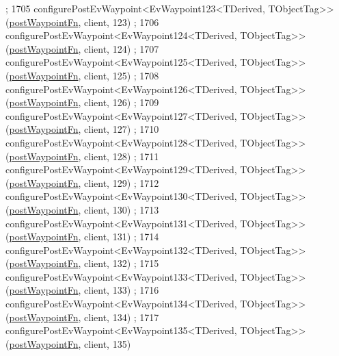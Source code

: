 \begin{DoxyCode}
      ;
1705     configurePostEvWaypoint<EvWaypoint123<TDerived, TObjectTag>>(\hyperlink{classcl__move__base__z_1_1WaypointEventDispatcher_a964a57fcce5d48ec60243230722d8dd7}{postWaypointFn}, client, 123)
      ;
1706     configurePostEvWaypoint<EvWaypoint124<TDerived, TObjectTag>>(\hyperlink{classcl__move__base__z_1_1WaypointEventDispatcher_a964a57fcce5d48ec60243230722d8dd7}{postWaypointFn}, client, 124)
      ;
1707     configurePostEvWaypoint<EvWaypoint125<TDerived, TObjectTag>>(\hyperlink{classcl__move__base__z_1_1WaypointEventDispatcher_a964a57fcce5d48ec60243230722d8dd7}{postWaypointFn}, client, 125)
      ;
1708     configurePostEvWaypoint<EvWaypoint126<TDerived, TObjectTag>>(\hyperlink{classcl__move__base__z_1_1WaypointEventDispatcher_a964a57fcce5d48ec60243230722d8dd7}{postWaypointFn}, client, 126)
      ;
1709     configurePostEvWaypoint<EvWaypoint127<TDerived, TObjectTag>>(\hyperlink{classcl__move__base__z_1_1WaypointEventDispatcher_a964a57fcce5d48ec60243230722d8dd7}{postWaypointFn}, client, 127)
      ;
1710     configurePostEvWaypoint<EvWaypoint128<TDerived, TObjectTag>>(\hyperlink{classcl__move__base__z_1_1WaypointEventDispatcher_a964a57fcce5d48ec60243230722d8dd7}{postWaypointFn}, client, 128)
      ;
1711     configurePostEvWaypoint<EvWaypoint129<TDerived, TObjectTag>>(\hyperlink{classcl__move__base__z_1_1WaypointEventDispatcher_a964a57fcce5d48ec60243230722d8dd7}{postWaypointFn}, client, 129)
      ;
1712     configurePostEvWaypoint<EvWaypoint130<TDerived, TObjectTag>>(\hyperlink{classcl__move__base__z_1_1WaypointEventDispatcher_a964a57fcce5d48ec60243230722d8dd7}{postWaypointFn}, client, 130)
      ;
1713     configurePostEvWaypoint<EvWaypoint131<TDerived, TObjectTag>>(\hyperlink{classcl__move__base__z_1_1WaypointEventDispatcher_a964a57fcce5d48ec60243230722d8dd7}{postWaypointFn}, client, 131)
      ;
1714     configurePostEvWaypoint<EvWaypoint132<TDerived, TObjectTag>>(\hyperlink{classcl__move__base__z_1_1WaypointEventDispatcher_a964a57fcce5d48ec60243230722d8dd7}{postWaypointFn}, client, 132)
      ;
1715     configurePostEvWaypoint<EvWaypoint133<TDerived, TObjectTag>>(\hyperlink{classcl__move__base__z_1_1WaypointEventDispatcher_a964a57fcce5d48ec60243230722d8dd7}{postWaypointFn}, client, 133)
      ;
1716     configurePostEvWaypoint<EvWaypoint134<TDerived, TObjectTag>>(\hyperlink{classcl__move__base__z_1_1WaypointEventDispatcher_a964a57fcce5d48ec60243230722d8dd7}{postWaypointFn}, client, 134)
      ;
1717     configurePostEvWaypoint<EvWaypoint135<TDerived, TObjectTag>>(\hyperlink{classcl__move__base__z_1_1WaypointEventDispatcher_a964a57fcce5d48ec60243230722d8dd7}{postWaypointFn}, client, 135)

\end{DoxyCode}
